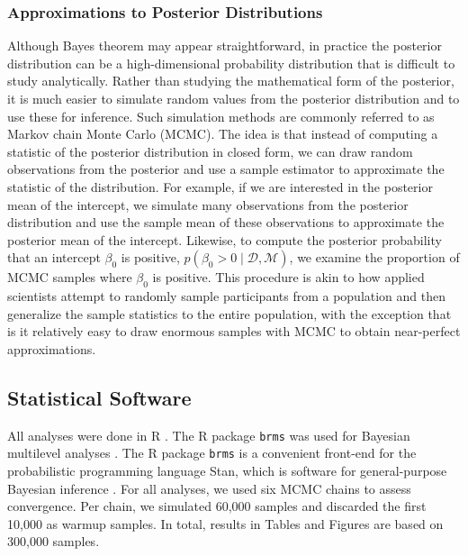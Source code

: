 \documentclass[a4paper]{article}
\newcommand{\code}[1]{\texttt{#1}}
\newcommand{\prob}[1]{p\left(#1\right)}
\newcommand{\data}{\mathcal{D}}
\newcommand{\model}{\mathcal{M}}
\begin{document}
\subsubsection*{Approximations to Posterior Distributions}
Although Bayes theorem may appear straightforward, in practice the posterior distribution can be a high-dimensional probability distribution that is difficult to study analytically. Rather than studying the mathematical form of the posterior, it is much easier to simulate random values from the posterior distribution and to use these for inference. Such simulation methods are commonly referred to as Markov chain Monte Carlo (MCMC). The idea is that instead of computing a statistic of the posterior distribution in closed form, we can draw random observations from the posterior and use a sample estimator to approximate the statistic of the distribution. For example, if we are interested in the posterior mean of the intercept, we simulate many observations from the posterior distribution and use the sample mean of these observations to approximate the posterior mean of the intercept. Likewise, to compute the posterior probability that an intercept $\beta_0$ is positive, $\prob{\beta_0 > 0 \mid \data , \model}$, we examine the proportion of MCMC samples where $\beta_0$ is positive. This procedure is akin to how applied scientists attempt to randomly sample participants from a population and then generalize the sample statistics to the entire population, with the exception that is it relatively easy to draw enormous samples with MCMC to obtain near-perfect approximations.

\subsection*{Statistical Software}
All analyses were done in R \cite{R}. The R package \code{brms} was used for Bayesian multilevel analyses \cite{burkner2017brms}. The R package \code{brms} is a convenient front-end for the probabilistic programming language Stan, which is software for general-purpose Bayesian inference \cite{carpenter2017stan}. For all analyses, we used six MCMC chains to assess convergence. Per chain, we simulated 60,000 samples and discarded the first 10,000 as warmup samples. In total, results in Tables and Figures are based on 300,000 samples.
\end{document}
